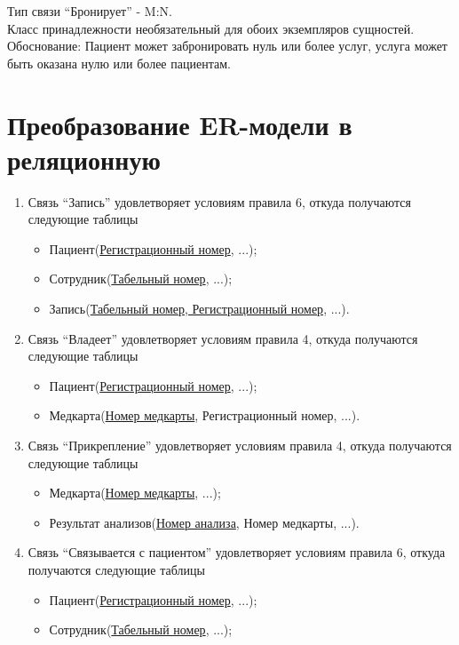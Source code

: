 \documentclass[14pt,a4paper,russian]{extreport}
\begin{document}
\noindent Тип связи ``Бронирует'' - M:N.\\
Класс принадлежности необязательный для обоих экземпляров сущностей.\\
Обоснование: Пациент может забронировать нуль или более услуг, услуга может быть оказана нулю
или более пациентам.

\section{Преобразование ER-модели в реляционную}
\begin{enumerate}
    \item Связь ``Запись'' удовлетворяет условиям правила 6, откуда получаются следующие
        таблицы
        \begin{itemize}
            \item Пациент(\underline{Регистрационный номер}, ...);
            \item Сотрудник(\underline{Табельный номер}, ...);
            \item Запись(\underline{Табельный номер, Регистрационный номер}, ...).
        \end{itemize}
    \item Связь ``Владеет'' удовлетворяет условиям правила 4, откуда получаются следующие таблицы
        \begin{itemize}
            \item Пациент(\underline{Регистрационный номер}, ...);
            \item Медкарта(\underline{Номер медкарты}, Регистрационный номер, ...).
        \end{itemize}
    \item Связь ``Прикрепление'' удовлетворяет условиям правила 4, откуда получаются следующие
        таблицы
        \begin{itemize}
            \item Медкарта(\underline{Номер медкарты}, ...);
            \item Результат анализов(\underline{Номер анализа}, Номер медкарты, ...).
        \end{itemize}
    \item Связь ``Связывается с пациентом'' удовлетворяет условиям правила 6, откуда получаются
        следующие таблицы
        \begin{itemize}
            \item Пациент(\underline{Регистрационный номер}, ...);
            \item Сотрудник(\underline{Табельный номер}, ...);

\end{itemize}
\end{enumerate}
\end{document}
